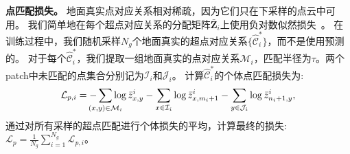 \textbf{点匹配损失。}
%
地面真实点对应关系相对稀疏，因为它们只在下采样的点云中可用。
我们简单地在每个超点对应关系的分配矩阵$\bar{\textbf{Z}}_i$上使用负对数似然损失~\cite{sarlin2020superglue}。
在训练过程中，我们随机采样$N_g$个地面真实的超点对应关系$\{\hat{\mathcal{C}}^{*}_i\}$，而不是使用预测的。
对于每个$\hat{\mathcal{C}}^{*}_i$，我们提取一组地面真实的点对应关系$\mathcal{M}_i$，匹配半径为$\tau$。两个patch中未匹配的点集合分别记为$\mathcal{I}_i$和$\mathcal{J}_i$。
计算$\hat{\mathcal{C}}^{*}_i$的个体点匹配损失为:
\begin{equation}
\mathcal{L}_{p, i} = -\sum_{\mathclap{{(x, y) \in \mathcal{M}_i}}} \log \bar{z}^i_{x, y} - \sum_{x \in \mathcal{I}_i} \log \bar{z}^i_{x, m_i+1} - \sum_{y \in \mathcal{J}_i} \log \bar{z}^i_{n_i+1, y},
\end{equation}
通过对所有采样的超点匹配进行个体损失的平均，计算最终的损失: $\mathcal{L}_p = \frac{1}{N_g} \sum^{N_g}_{i=1} \mathcal{L}_{p, i}$。
 
